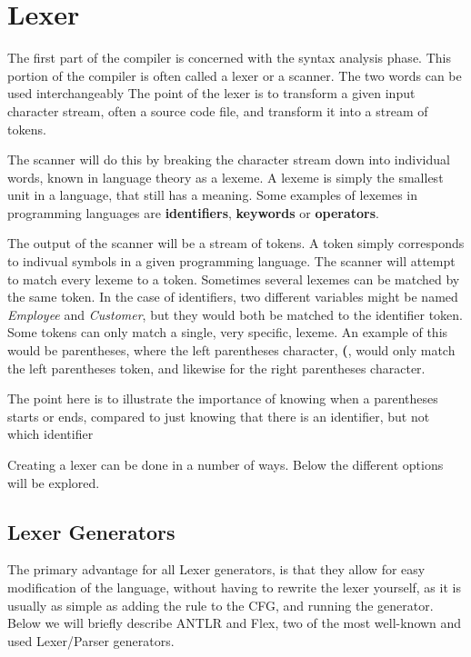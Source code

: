 \section{Lexer}
The first part of the compiler is concerned with the syntax analysis phase.
This portion of the compiler is often called a lexer or a scanner.
The two words can be used interchangeably 
The point of the lexer is to transform a given input character stream, often a source code file, and transform it into a stream of tokens.

The scanner will do this by breaking the character stream down into individual words, known in language theory as a lexeme.
A lexeme is simply the smallest unit in a language, that still has a meaning.
Some examples of lexemes in programming languages are \textbf{identifiers}, \textbf{keywords} or \textbf{operators}.

The output of the scanner will be a stream of tokens.
A token simply corresponds to indivual symbols in a given programming language.
The scanner will attempt to match every lexeme to a token.
Sometimes several lexemes can be matched by the same token.
In the case of identifiers, two different variables might be named \textit{Employee} and \textit{Customer}, but they would both be matched to the identifier token.
Some tokens can only match a single, very specific, lexeme.
An example of this would be parentheses, where the left parentheses character, \textbf{(}, would only match the left parentheses token, and likewise for the right parentheses character.

The point here is to illustrate the importance of knowing when a parentheses starts or ends, compared to just knowing that there is an identifier, but not which identifier


Creating a lexer can be done in a number of ways.
Below the different options will be explored.
\subsection{Lexer Generators}
The primary advantage for all Lexer generators, is that they allow for easy modification of the language, without having to  rewrite the lexer yourself, as it is usually as simple as adding the rule to the CFG, and running the generator.
Below we will briefly describe ANTLR and Flex, two of the most well-known and used Lexer/Parser generators.

